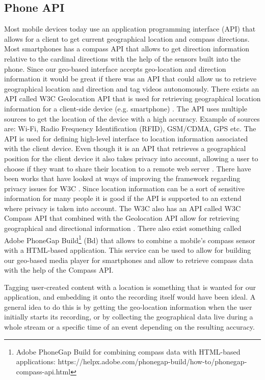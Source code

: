 \subsection{Phone API}
\label{sec:phoneapi}
Most mobile devices today use an application programming interface (API) that allows for a client to get current geographical location and compass directions. Most smartphones has a compass API that allows to get direction information relative to the cardinal directions with the help of the sensors built into the phone. Since our geo-based interface accepts geo-location and direction information it would be great if there was an API that could allow us to retrieve geographical location and direction and tag videos autonomously. There exists an API called W3C Geolocation API that is used for retrieving geographical location information for a client-side device (e.g. smartphone) \cite{geoapi}. The API uses multiple sources to get the location of the device with a high accuracy. Example of sources are: Wi-Fi, Radio Frequency Identification (RFID), GSM/CDMA, GPS etc. The API is used for defining high-level interface to location information associated with the client device. Even though it is an API that retrieves a geographical position for the client device it also takes privacy into account, allowing a user to choose if they want to share their location to a remote web server \cite{useofgeo}. There have been works that have looked at ways of improving the framework regarding privacy issues for W3C \cite{privacyissues}. Since location information can be a sort of sensitive information for many people it is good if the API is supported to an extend where privacy is taken into account. The W3C also has an API called W3C Compass API that combined with the Geolocation API allow for retrieving geographical and directional information \cite{compassapi}. There also exist something called Adobe PhoneGap Build\footnote{Adobe PhoneGap Build for combining compass data with HTML-based applications: https://helpx.adobe.com/phonegap-build/how-to/phonegap-compass-api.html} (Bd) that allows to combine a mobile’s compass sensor with a HTML-based application. This service can be used to allow for building our geo-based media player for smartphones and allow to retrieve compass data with the help of the Compass API.

Tagging user-created content with a location is something that is wanted for our application, and embedding it onto the recording itself would have been ideal. A general idea to do this is by getting the geo-location information when the user initially starts its recording, or by collecting the geographical data live during a whole stream or a specific time of an event depending on the resulting accuracy. \cite{locationstrategies}

